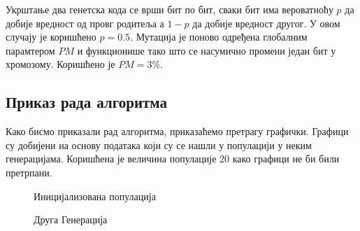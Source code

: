 \documentclass{article}
\begin{document}
Укрштање два генетска кода се врши бит по бит, сваки бит има вероватноћу  $p$
да добије вредност од провг родитеља а $1 - p$ да добије вредност другог. У овом
случају је коришћено $p = 0.5$. Мутација је поново одређена глобалним парамтером $PM$ 
и функционише тако што се насумично промени један бит у хромозому. Коришћено је 
$PM = 3\%$.


\subsection{Приказ рада алгоритма}
Како бисмо приказали рад алгоритма, приказаћемо претрагу графички. Графици су добијени на основу података
који су се нашли у популацији у неким генерацијама. Коришћена је величина популације 20 како графици не би били
претрпани.

\begin{figure}[H]
    \centering

    \caption{Иницијализована популација}
\end{figure}

\begin{figure}[H]
    \centering

    \caption{Друга Генерација}
\end{figure}
\end{document}
